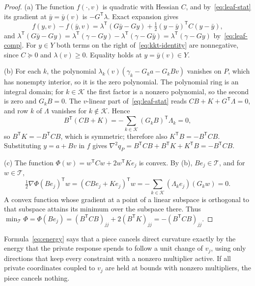 \begin{proof}
(a) The function $f(\cdot,v)$ is quadratic with Hessian $C$, and
by~\eqref{eq:leaf-stat} its gradient at $\bar y=\bar y(v)$ is
$-G^{\mathsf T}\lambda$. Exact expansion gives
\[
f(y,v)-f(\bar y,v)=\lambda^{\mathsf T}(G\bar y-Gy)+\tfrac12(y-\bar y)^{\mathsf T}C(y-\bar y),
\]
and $\lambda^{\mathsf T}(G\bar y-Gy)=\lambda^{\mathsf T}(\gamma-Gy)-\lambda^{\mathsf T}(\gamma-G\bar y)
=\lambda^{\mathsf T}(\gamma-Gy)$ by~\eqref{eq:leaf-comp}. For $y\in Y$ both
terms on the right of~\eqref{eq:kkt-identity} are nonnegative, since
$C\succeq0$ and $\lambda(v)\ge0$. Equality holds at $y=\bar y(v)\in Y$.

(b) For each $k$, the polynomial $\lambda_k(v)(\gamma_k-G_k a-G_kBv)$ vanishes
on $P$, which has nonempty interior, so it is the zero polynomial. The
polynomial ring is an integral domain; for $k\in\mathcal K$ the first factor
is a nonzero polynomial, so the second is zero and $G_kB=0$. The $v$-linear
part of~\eqref{eq:leaf-stat} reads $CB+K+G^{\mathsf T}\Lambda=0$, and row $k$
of $\Lambda$ vanishes for $k\notin\mathcal K$. Hence
\[
B^{\mathsf T}(CB+K)=-\sum_{k\in\mathcal K}(G_kB)^{\mathsf T}\Lambda_k=0,
\]
so $B^{\mathsf T}K=-B^{\mathsf T}CB$, which is symmetric; therefore also
$K^{\mathsf T}B=-B^{\mathsf T}CB$. Substituting $y=a+Bv$ in $f$ gives
$\nabla^2q_P=B^{\mathsf T}CB+B^{\mathsf T}K+K^{\mathsf T}B=-B^{\mathsf T}CB$.

(c) The function $\Phi(w)=w^{\mathsf T}Cw+2w^{\mathsf T}Ke_j$ is convex. By (b),
$Be_j\in\mathcal T$, and for $w\in\mathcal T$,
\[
\tfrac12\nabla\Phi(Be_j)^{\mathsf T}w=(CBe_j+Ke_j)^{\mathsf T}w
=-\sum_{k\in\mathcal K}(\Lambda_ke_j)(G_kw)=0.
\]
A convex function whose gradient at a point of a linear subspace is
orthogonal to that subspace attains its minimum over the subspace there. Thus
$\min_{\mathcal T}\Phi=\Phi(Be_j)=(B^{\mathsf T}CB)_{jj}+2(B^{\mathsf T}K)_{jj}
=-(B^{\mathsf T}CB)_{jj}$.
\end{proof}

Formula~\eqref{eq:energy} says that a piece cancels direct curvature exactly
by the energy that the private response spends to follow a unit change of
$v_j$, using only directions that keep every constraint with a nonzero
multiplier active. If all private coordinates coupled to $v_j$ are held at
bounds with nonzero multipliers, the piece cancels nothing.

